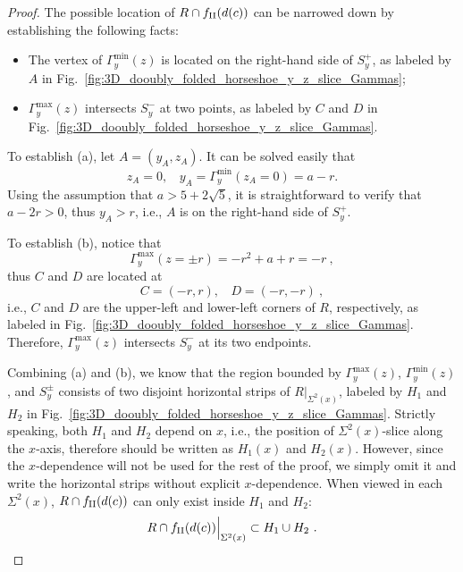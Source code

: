 \documentclass[12pt]{iopart}
\begin{document}
\begin{proof}
The possible location of $R\cap f_{\rm II}(d(c))$ can be narrowed down by establishing the following facts:
\begin{itemize}
\item[(a)] The vertex of $\Gamma^{\min}_y(z)$ is located on the right-hand side of $S^+_y$, as labeled by $A$ in Fig.~\ref{fig:3D_dooubly_folded_horseshoe_y_z_slice_Gammas};
\item[(b)] $\Gamma^{\max}_y(z)$ intersects $S^-_y$ at two points, as labeled by $C$ and $D$ in Fig.~\ref{fig:3D_dooubly_folded_horseshoe_y_z_slice_Gammas}. 
\end{itemize} 

To establish (a), let $A=(y_A,z_A)$. It can be solved easily that
\begin{equation}
z_A=0, ~~~~ y_A = \Gamma^{\min}_y(z_A=0)=a-r. 
\end{equation}
Using the assumption that $a>5+2\sqrt{5}$, it is straightforward to verify that $a-2r>0$, thus $y_A >r$, i.e., $A$ is on the right-hand side of $S^{+}_y$. 

To establish (b), notice that
\begin{equation}
\Gamma^{\max}_y(z=\pm r) = -r^2 +a +r = -r\ ,
\end{equation}
thus $C$ and $D$ are located at
\begin{equation}
C = (-r,r), ~~~~ D=(-r,-r)\ ,
\end{equation}
i.e., $C$ and $D$ are the upper-left and lower-left corners of $R$, respectively, as labeled in Fig.~\ref{fig:3D_dooubly_folded_horseshoe_y_z_slice_Gammas}. Therefore, $\Gamma^{\max}_y(z)$ intersects $S^-_y$ at its two endpoints. 

Combining (a) and (b), we know that the region bounded by $\Gamma^{\max}_y(z)$, $\Gamma^{\min}_y(z)$, and $S^{\pm}_y$ consists of two disjoint horizontal strips of $R|_{\Sigma^2(x)}$, labeled by $H_1$ and $H_2$ in Fig.~\ref{fig:3D_dooubly_folded_horseshoe_y_z_slice_Gammas}. Strictly speaking, both $H_1$ and $H_2$ depend on $x$, i.e., the position of $\Sigma^2(x)$-slice along the $x$-axis, therefore should be written as $H_1(x)$ and $H_2(x)$. However, since the $x$-dependence will not be used for the rest of the proof, we simply omit it and write the horizontal strips without explicit $x$-dependence. When viewed in each $\Sigma^2(x)$, $R \cap f_{\rm II}(d(c))$ can only exist inside $H_1$ and $H_2$:
\begin{equation}\label{eq:V intersects f_II D y z slice first bound}
R \cap f_{\rm II}(d(c)) \Big|_{\Sigma^2(x)} \subset H_1 \cup H_2 \ .
\end{equation}


\end{proof}
\end{document}

